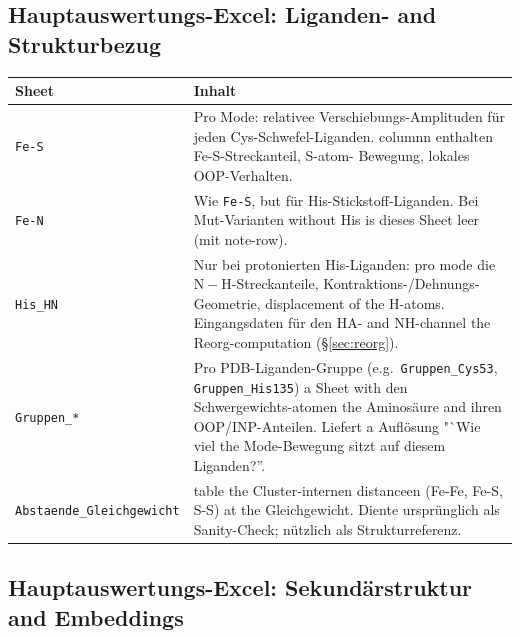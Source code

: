 \documentclass[11pt,a4paper,twoside]{article}
\theoremstyle{remark}
\begin{document}
\subsection{Hauptauswertungs-Excel: Liganden- and Strukturbezug}

\begin{longtable}{p{} p{}}
\toprule
\textbf{Sheet} & \textbf{Inhalt} \\
\midrule
\endhead

\texttt{Fe-S} & Pro Mode: relativee Verschiebungs-Amplituden f\"ur jeden
  Cys-Schwefel-Liganden. columnn enthalten Fe-S-Streckanteil, S-atom-
  Bewegung, lokales OOP-Verhalten. \\

\texttt{Fe-N} & Wie \texttt{Fe-S}, but f\"ur His-Stickstoff-Liganden.
  Bei Mut-Varianten without His is dieses Sheet leer (mit
  note-row). \\

\texttt{His\_HN} & Nur bei protonierten His-Liganden: pro mode die
  $\mathrm{N}-\mathrm{H}$-Streckanteile, Kontraktions-/Dehnungs-
  Geometrie, displacement of the H-atoms. Eingangsdaten f\"ur den
  HA- and NH-channel the Reorg-computation
  (\S\ref{sec:reorg}). \\

\texttt{Gruppen\_*} & Pro PDB-Liganden-Gruppe (e.g.\
  \texttt{Gruppen\_Cys53}, \texttt{Gruppen\_His135}) a Sheet with den
  Schwergewichts-atomen the Aminos\"aure and ihren OOP/INP-Anteilen.
  Liefert a Aufl\"osung "`Wie viel the Mode-Bewegung sitzt auf
  diesem Liganden?''. \\

\texttt{Abstaende\_Gleichgewicht} & table the Cluster-internen
  distanceen (Fe-Fe, Fe-S, S-S) at the Gleichgewicht. Diente urspr\"unglich
  als Sanity-Check; n\"utzlich als Strukturreferenz. \\
\bottomrule
\end{longtable}

\subsection{Hauptauswertungs-Excel: Sekund\"arstruktur and Embeddings}
\end{document}
